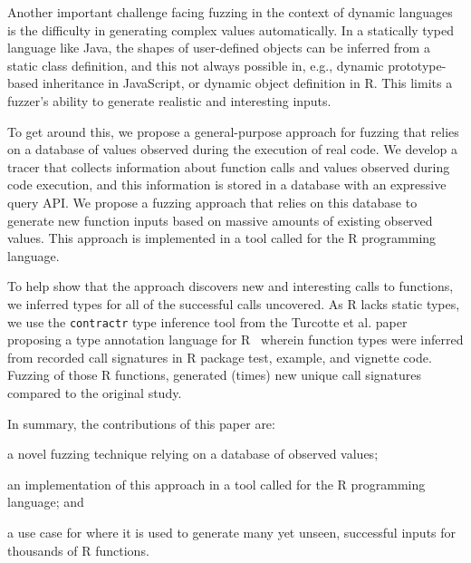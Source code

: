 \documentclass[sigplan,anonymous,review]{acmart}
\begin{document}
Another important challenge facing fuzzing in the context of dynamic languages is the difficulty in generating complex values automatically.
In a statically typed language like Java, the shapes of user-defined objects can be inferred from a static class definition, and this not always possible in, e.g., dynamic prototype-based inheritance in JavaScript, or dynamic object definition in R.
This limits a fuzzer's ability to generate realistic and interesting inputs.

To get around this, we propose a general-purpose approach for fuzzing that relies on a database of values observed during the execution of real code.
We develop a tracer that collects information about function calls and values observed during code execution, and this information is stored in a database with an expressive query API.
We propose a fuzzing approach that relies on this database to generate new function inputs based on massive amounts of existing observed values.
This approach is implemented in a tool called \tool for the R programming language.

To help show that the approach discovers new and interesting calls to functions, we inferred types for all of the successful calls \tool uncovered.
As R lacks static types, we use the {\tt contractr} type inference tool from the Turcotte et al. paper proposing a type annotation language for R~\cite{turcotte2020designing} wherein function types were inferred from recorded call signatures in R package test, example, and vignette code.
Fuzzing \UFNumFunctions of those R functions, \tool generated \UFSignatrSignaturesRnd (\UFSignatrBaselineSignaturesRatio times) new unique call signatures compared to the original study.



In summary, the contributions of this paper are:
%
\begin{inparaenum}[(1)]
    \item a novel fuzzing technique relying on a database of observed values;
    \item an implementation of this approach in a tool called \tool for the R programming language; and
    \item a use case for \tool where it is used to generate many yet unseen, successful inputs for thousands of R functions.
\end{inparaenum} 
\end{document}
